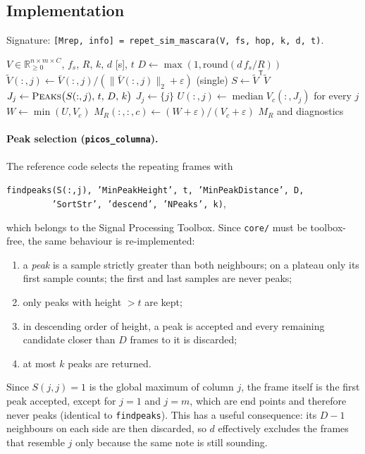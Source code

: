 \documentclass[11pt,a4paper]{article}
\newcommand{\code}[1]{\texttt{#1}}
\newcommand{\R}{\mathbb{R}}
\DeclareMathOperator*{\median}{median}
\begin{document}
\subsection{Implementation}
Signature: \code{[Mrep, info] = repet\_sim\_mascara(V, fs, hop, k, d, t)}.

\begin{algorithm}[htbp]
\caption{REPET-SIM mask (\code{repet\_sim\_mascara})}
\begin{algorithmic}[1]
\Require $V\in\R_{\ge0}^{n\times m\times C}$, $f_s$, $R$, $k$, $d$ [s], $t$
\State $D\gets\max(1,\mathrm{round}(d\,f_s/R))$ 
\State $\tilde V(:,j) \gets \bar V(:,j)/(\|\bar V(:,j)\|_2+\varepsilon)$ (single)
\State $S\gets \tilde V^{\mathsf T}\tilde V$ 
   \State $J_j \gets \textsc{Peaks}\big(S(:,j),\,t,\,D,\,k\big)$
    $J_j\gets\{j\}$ \EndIf
\EndFor
{}
   \State $U(:,j)\gets\median V_c(:,J_j)$ for every $j$ 
   \State $W\gets\min(U,V_c)$ 
   \State $M_R(:,:,c)\gets(W+\varepsilon)/(V_c+\varepsilon)$ 
\EndFor
\State \Return $M_R$ and diagnostics
\end{algorithmic}
\end{algorithm}

\paragraph{Peak selection (\code{picos\_columna}).} The reference code
selects the repeating frames with
\begin{center}
\code{findpeaks(S(:,j), 'MinPeakHeight', t, 'MinPeakDistance', D,}\\
\code{\ \ \ \ \ \ \ \ \ 'SortStr', 'descend', 'NPeaks', k)},
\end{center}
which belongs to the Signal Processing Toolbox. Since \code{core/} must be
toolbox-free, the same behaviour is re-implemented:
\begin{enumerate}[nosep]
  \item a \emph{peak} is a sample strictly greater than both neighbours;
        on a plateau only its first sample counts; the first and last
        samples are never peaks;
  \item only peaks with height $>t$ are kept;
  \item in descending order of height, a peak is accepted and every
        remaining candidate closer than $D$ frames to it is discarded;
  \item at most $k$ peaks are returned.
\end{enumerate}
Since $S(j,j)=1$ is the global maximum of column $j$, the frame itself is
the first peak accepted, except for $j=1$ and $j=m$, which are
end points and therefore never peaks (identical to \code{findpeaks}). This has a useful consequence: its
$D-1$ neighbours on each side are then discarded, so $d$ effectively
excludes the frames that resemble $j$ only because the same note is still
sounding.
\end{document}
